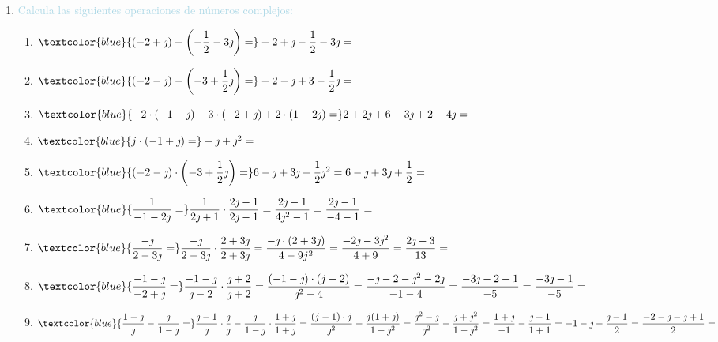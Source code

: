 \begin{center}
	\large\textbf{}
\end{center}
\begin{enumerate}[label=\color{red}\textbf{\arabic*)}, leftmargin=*]
	\item \textcolor{lightblue}{Calcula las siguientes operaciones de números complejos:}
\begin{enumerate}[label=\color{red}\alph*)]
	\item $\textcolor{blue}{(-2+\jmath )+\left(-\dfrac{1}{2}-3\jmath\right)=}-2+\jmath -\dfrac{1}{2}-3\jmath=$ 
	\item $\textcolor{blue}{(-2-\jmath )-\left(-3+\dfrac{1}{2}\jmath\right)=}-2-\jmath +3-\dfrac{1}{2}\jmath=$
	\item $\textcolor{blue}{-2\cdot(-1-\jmath )-3\cdot(-2+\jmath )+2\cdot(1-2\jmath)=}2+2\jmath+6-3\jmath+2-4\jmath=$ 
	\item $\textcolor{blue}{j\cdot(-1+\jmath )=}-\jmath +\jmath ^2=$ 
	\item $\textcolor{blue}{(-2-\jmath )\cdot\left(-3+\dfrac{1}{2}\jmath\right)=} 6-\jmath +3\jmath-\dfrac{1}{2}\jmath^2=6-\jmath +3\jmath+\dfrac{1}{2}=$ 
	\item $\textcolor{blue}{\dfrac{1}{-1-2\jmath}=}\dfrac{1}{2\jmath+1}\cdot\dfrac{2\jmath-1}{2\jmath-1}=\dfrac{2\jmath-1}{4\jmath^2-1}=\dfrac{2\jmath-1}{-4-1}=$ 
	\item $\textcolor{blue}{\dfrac{-\jmath }{2-3\jmath}=}\dfrac{-\jmath }{2-3\jmath}\cdot\dfrac{2+3\jmath}{2+3\jmath}=\dfrac{-\jmath \cdot(2+3\jmath)}{4-9j^2}=\dfrac{-2\jmath-3\jmath^2}{4+9}=\dfrac{2\jmath-3}{13}=$ 
	\item $\textcolor{blue}{\dfrac{-1-\jmath }{-2+\jmath }=}\dfrac{-1-\jmath }{\jmath-2}\cdot\dfrac{\jmath+2}{\jmath+2}=\dfrac{(-1-\jmath )\cdot(j+2)}{\jmath^2-4}=\dfrac{-\jmath -2-\jmath ^2-2\jmath}{-1-4}=\dfrac{-3\jmath-2+1}{-5}=\dfrac{-3\jmath-1}{-5}=$ 
	\item $\textcolor{blue}{\dfrac{1-\jmath }{\jmath}-\dfrac{\jmath}{1-\jmath }=}\dfrac{\jmath-1}{\jmath}\cdot\dfrac{\jmath}{\jmath}-\dfrac{\jmath}{1-\jmath }\cdot\dfrac{1+\jmath }{1+\jmath }=\dfrac{(j-1)\cdot j}{\jmath^2}-\dfrac{j(1+\jmath )}{1-\jmath ^2}=\dfrac{\jmath^2-\jmath }{\jmath^2}-\dfrac{\jmath+\jmath ^2}{1-\jmath ^2}=\dfrac{1+\jmath }{-1}-\dfrac{\jmath-1}{1+1}=-1-\jmath -\dfrac{\jmath-1}{2}=\dfrac{-2-\jmath -\jmath +1}{2}=$ 

\end{enumerate}
\end{enumerate}
